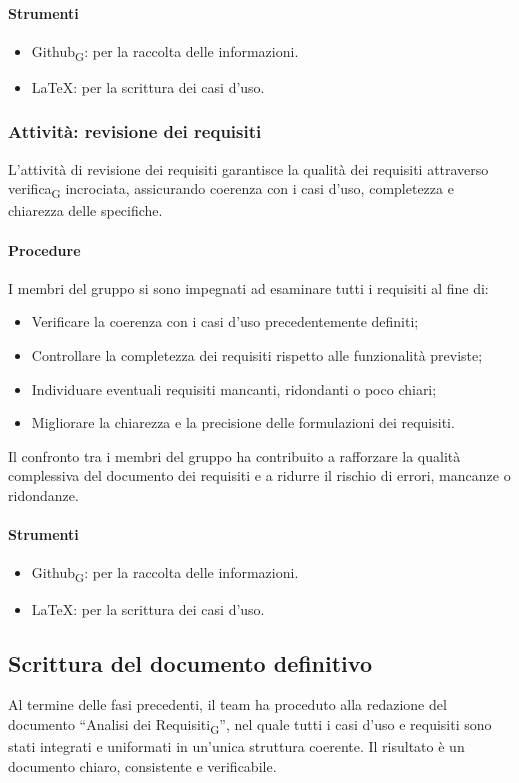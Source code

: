 \documentclass[11pt,a4paper]{article}
\newcommand{\gls}[1]{#1\textsubscript{G}}
\begin{document}
\paragraph{Strumenti}
\begin{itemize}
\item \gls{Github}: per la raccolta delle informazioni.
\item LaTeX: per la scrittura dei casi d'uso.
\end{itemize}

\subsubsection{Attività: revisione dei requisiti}
L’attività di revisione dei requisiti garantisce la qualità dei requisiti attraverso \gls{verifica} incrociata, assicurando coerenza con i casi d’uso, completezza e chiarezza delle specifiche.

\paragraph{Procedure}
I membri del gruppo si sono impegnati ad esaminare tutti i requisiti al fine di:
\begin{itemize}
\item Verificare la coerenza con i casi d’uso precedentemente definiti;
\item Controllare la completezza dei requisiti rispetto alle funzionalità previste;
\item Individuare eventuali requisiti mancanti, ridondanti o poco chiari;
\item Migliorare la chiarezza e la precisione delle formulazioni dei requisiti.
\end{itemize}
Il confronto tra i membri del gruppo ha contribuito a rafforzare la qualità complessiva del documento dei requisiti e a ridurre il rischio di errori, mancanze o ridondanze.

\paragraph{Strumenti}
\begin{itemize}
\item \gls{Github}: per la raccolta delle informazioni.
\item LaTeX: per la scrittura dei casi d'uso.
\end{itemize}

\subsection{Scrittura del documento definitivo}
Al termine delle fasi precedenti, il team ha proceduto alla redazione del documento “\gls{Analisi dei Requisiti}”, nel quale tutti i casi d’uso e requisiti sono stati integrati e uniformati in un’unica struttura coerente. Il risultato è un documento chiaro, consistente e verificabile.
\end{document}
